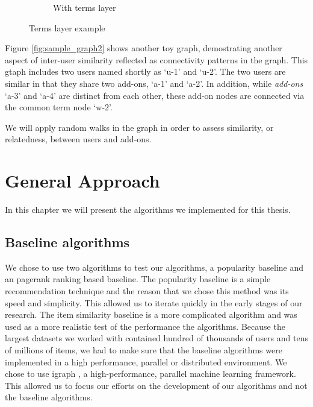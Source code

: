 \documentclass[11pt,oneside]{book}
\let\Oldsection\section
\renewcommand{\section}{\FloatBarrier\Oldsection}
\begin{document}
\begin{figure}[h]
\begin{subfigure}[b]{0.49\textwidth}
	\caption{With terms layer}
\end{subfigure}
	\caption{Terms layer example}
	\label{fig:terms_layer}
\end{figure}
  
Figure \ref{fig:sample_graph2} shows another toy graph, demostrating another aspect of inter-user similarity reflected as connectivity patterns in the graph. This gtaph includes two users named shortly as `u-1' and `u-2'. The two users are similar in that they share two add-ons, `a-1' and `a-2'. In addition, while {\it add-ons} `a-3' and `a-4' are distinct from each other, these add-on nodes are connected via the common term node `w-2'. 

We will apply random walks in the graph in order to assess similarity, or relatedness, between users and add-ons.  

\chapter{General Approach}
\label{sec:method}
In this chapter we will present the algorithms we implemented for this thesis.
\section{Baseline algorithms}
We chose to use two algorithms to test our algorithms, a popularity baseline and an pagerank ranking based baseline. The popularity baseline is a simple recommendation technique and the reason that we chose this method was its speed and simplicity. This allowed us to iterate quickly in the early stages of our research. The item similarity baseline is a more complicated algorithm and was used as a more realistic test of the performance the algorithms. Because the largest datasets we worked with contained hundred of thousands of users and tens of millions of items, we had to make sure that the
baseline algorithms were implemented in a high performance, parallel or distributed
environment. We chose to use igraph \citep{igraph}, a high-performance, parallel machine learning framework. This allowed us to focus our efforts on the development of our algorithms and not the baseline algorithms.
\end{document}
